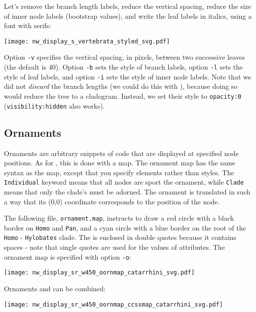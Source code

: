 \noindent{}Let's remove the branch length labels, reduce
the vertical spacing, reduce the size of inner node labels (bootstrap values),
and write the leaf labels in italics, using a font with serifs:

\begin{center}
  \texttt{[image: nw\_display\_s\_vertebrata\_styled\_svg.pdf]}
\end{center}
Option \texttt{-v} specifies the vertical spacing, in pixels, between two
successive leaves (the default is 40). Option \texttt{-b} sets the style of
branch labels, option \texttt{-l} sets the style of leaf labels, and option
\texttt{-i} sets the style of inner node labels. Note that we did not
\emph{discard} the branch lengths (we could do this with \topology), because
doing so would reduce the tree to a cladogram. Instead, we set their \css{}
style to \texttt{opacity:0} (\texttt{visibility:hidden} also works).

\subsection{Ornaments}

Ornaments are arbitrary snippets of \svg{} code that are displayed at specified
node positions. As for \css, this is done with a map. The ornament map has the
same syntax as the \css{} map, except that you specify \svg{} elements rather
than \css{} styles. The \texttt{Individual} keyword means that all nodes are
sport the ornament, while \texttt{Clade} means that only the clade's \lca{}
must be adorned. The ornament is translated in such a way that its (0,0)
coordinate corresponds to the position of the node.

The following file, \texttt{ornament.map}, instructs to draw a red circle with
a black border on \texttt{Homo} and \texttt{Pan}, and a cyan circle with a blue
border on the root of the \texttt{Homo} - \texttt{Hylobates} clade. The \svg{}
is enclosed in double quotes because it contains spaces - note that single
quotes are used for the values of \xml{} attributes. The ornament map is
specified with option \texttt{-o}:
\begin{quote}
 
\end{quote}

\begin{center}
 \texttt{[image: nw\_display\_sr\_w450\_oornmap\_catarrhini\_svg.pdf]}
\end{center}
Ornaments and \css{} can be combined:

\begin{center}
 \texttt{[image: nw\_display\_sr\_w450\_oornmap\_ccssmap\_catarrhini\_svg.pdf]}
\end{center}

